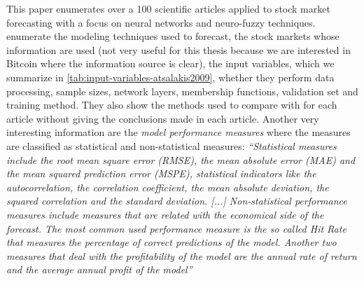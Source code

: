 This paper enumerates over a 100 scientific articles applied to stock
market forecasting with a focus on neural networks and neuro-fuzzy
techniques. \cite{atsalakis2009surveying} enumerate the modeling
techniques used to forecast, the stock markets whose information are
used (not very useful for this thesis because we are interested in
Bitcoin where the information source is clear), the input variables,
which we summarize in \autoref{tab:input-variables-atsalakis2009},
whether they perform data processing, sample sizes, network layers,
membership functions, validation set and training method. They also
show the methods used to compare with for each article without giving
the conclusions made in each article. Another very interesting
information are the \textit{model performance measures} where the
measures are classified as statistical and non-statistical measures:
\textit{``Statistical measures include the root mean square error
  (RMSE), the mean absolute error (MAE) and the mean squared
  prediction error (MSPE), statistical indicators like the
  autocorrelation, the correlation coefficient, the mean absolute
  deviation, the squared correlation and the standard deviation. [...]
  Non-statistical performance measures include measures that are
  related with the economical side of the forecast. The most common
  used performance measure is the so called Hit Rate that measures the
  percentage of correct predictions of the model. Another two measures
  that deal with the profitability of the model are the annual rate of
  return and the average annual profit of the model''}

